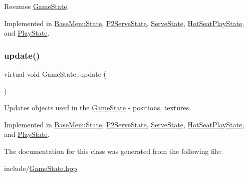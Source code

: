 Resumes \mbox{\hyperlink{class_game_state}{Game\+State}}. 



Implemented in \mbox{\hyperlink{class_base_menu_state_a8b0bba27d448b83a1f8f4ceca8dde07e}{Base\+Menu\+State}}, \mbox{\hyperlink{class_p2_serve_state_a46b9a456d44c6f22bf5bbdb62e71e490}{P2\+Serve\+State}}, \mbox{\hyperlink{class_serve_state_ae9a501a1f103b02685fdd4caac5685e5}{Serve\+State}}, \mbox{\hyperlink{class_hot_seat_play_state_a7acf9709fdb1527a321730c49783cb50}{Hot\+Seat\+Play\+State}}, and \mbox{\hyperlink{class_play_state_ad4dda6c0b72ce34bd9caaade8a5562b9}{Play\+State}}.

\mbox{\label{class_game_state_a66b11afe355a9479f94aaf76576980bd}} 
\subsubsection{\texorpdfstring{update()}{update()}}
{\footnotesize\ttfamily virtual void Game\+State\+::update (\begin{DoxyParamCaption}\item[{\mbox{\hyperlink{class_game_engine}{Game\+Engine}} $\ast$}]{ }\end{DoxyParamCaption})\hspace{0.3cm}{\ttfamily [pure virtual]}}



Updates objects used in the \mbox{\hyperlink{class_game_state}{Game\+State}} -\/ positions, textures. 



Implemented in \mbox{\hyperlink{class_base_menu_state_abfc8c5d2c7c3811443fc79a107a5936e}{Base\+Menu\+State}}, \mbox{\hyperlink{class_p2_serve_state_a1f0ddd25c72c4e9033418a32f5389e22}{P2\+Serve\+State}}, \mbox{\hyperlink{class_serve_state_ac227c95e6d1ed3f3d1fc01c4035db847}{Serve\+State}}, \mbox{\hyperlink{class_hot_seat_play_state_a63baf261e84e10203286fc82082cccdd}{Hot\+Seat\+Play\+State}}, and \mbox{\hyperlink{class_play_state_ad784c6b3e75c68505df30d51ebce4523}{Play\+State}}.



The documentation for this class was generated from the following file\+:\begin{DoxyCompactItemize}
\item 
include/\mbox{\hyperlink{_game_state_8hpp}{Game\+State.\+hpp}}\end{DoxyCompactItemize}
